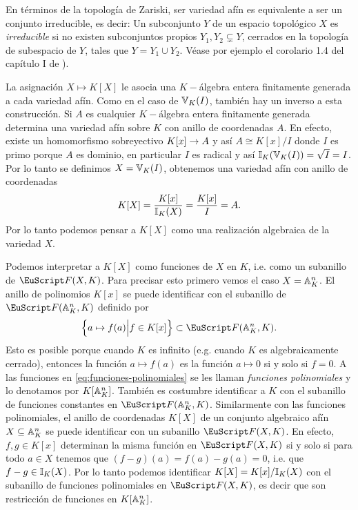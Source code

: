 \documentclass[../../tesis_maestria]{subfiles}
\begin{document}
\begin{nota}
	 En términos de la topología de Zariski, ser variedad afín es equivalente a ser un conjunto irreducible, es decir: Un subconjunto $Y$ de un espacio topológico $X$ es \emph{irreducible} si no existen subconjuntos propios $Y_1,Y_2\subsetneq Y$, cerrados en la topología de subespacio de $Y$, tales que $Y=Y_1\cup Y_2$. Véase por ejemplo el corolario 1.4 del capítulo I de \cite{HartshorneAG}).
\end{nota}

La asignación $X\mapsto K[X]$ le asocia una $K-$álgebra entera finitamente generada a cada variedad afín. Como en el caso de $\mathbb{V}_K(I)$, también hay un inverso a esta construcción. Si $A$ es cualquier $K-$álgebra entera finitamente generada determina una variedad afín sobre $K$ con anillo de coordenadas $A$. En efecto, existe un homomorfismo sobreyectivo $K[x]\rightarrow A$ y así $A\cong K[x]/I$ donde $I$ es primo porque $A$ es dominio, en particular $I$ es radical y así $\mathbb{I}_K(\mathbb{V}_K(I))=\sqrt{I}=I$. Por lo tanto se definimos $X=\mathbb{V}_K(I)$, obtenemos una variedad afín con anillo de coordenadas
\[
	K[X]=\frac{K[x]}{\mathbb{I}_K(X)}=\frac{K[x]}{I}=A.
\]
Por lo tanto podemos pensar a $K[X]$ como una realización algebraica de la variedad $X$.

Podemos interpretar a $K[X]$ como funciones de $X$ en $K$, i.e. como un subanillo de $\Ff(X,K)$. Para precisar esto primero vemos el caso $X=\mathbb{A}^n_K$. El anillo de polinomios $K[x]$ se puede identificar con el subanillo de $\Ff(\AAA^n_K,K)$ definido por
\begin{equation}\label{eq:funciones-polinomiales}
	\Big\{a\mapsto f(a)\Big| f\in K[x]\Big\}\subset\Ff(\AAA^n_K,K).
\end{equation}
Esto es posible porque cuando $K$ es infinito (e.g. cuando $K$ es algebraicamente cerrado), entonces la función $a\mapsto f(a)$ es la función $a\mapsto0$ si y solo si $f=0$. A las funciones en \eqref{eq:funciones-polinomiales} se les llaman \emph{funciones polinomiales} y lo denotamos por $K[\mathbb{A}^n_K]$. También es costumbre identificar a $K$ con el subanillo de funciones constantes en $\Ff(\AAA^n_K,K)$. Similarmente con las funciones polinomiales, el anillo de coordenadas $K[X]$ de un conjunto algebraico afín $X\subseteq\mathbb{A}^n_K$ se puede identificar con un subanillo $\Ff(X,K)$. En efecto, $f,g\in K[x]$ determinan la misma función en $\Ff(X,K)$ si y solo si para todo $a\in X$ tenemos que $(f-g)(a)=f(a)-g(a)=0$, i.e. que $f-g\in\mathbb{I}_K(X)$. Por lo tanto podemos identificar $K[X]=K[x]/\mathbb{I}_K(X)$ con el subanillo de funciones polinomiales en $\Ff(X,K)$, es decir que son restricción de funciones en $K[\mathbb{A}^n_K]$.
\end{document}
